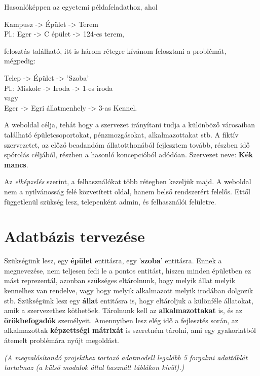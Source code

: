 \documentclass[a4paper,12pt]{article}
\begin{document}
Hasonlóképpen az egyetemi példafeladathoz, ahol
\begin{center}
	Kampusz -> Épület -> Terem \\[0.5cm]
	Pl.: Eger -> C épület -> 124-es terem,
\end{center}
felosztás található, itt is három rétegre kívánom felosztani a problémát, mégpedig:
\begin{center}
	Telep -> Épület -> 'Szoba'\\[0.5cm]
	Pl.: Miskolc -> Iroda -> 1-es iroda\\
	vagy\\
	Eger -> Egri állatmenhely -> 3-as Kennel.
\end{center}

A weboldal célja, tehát hogy a szervezet irányítani tudja a különböző városaiban található épületcsoportokat, pénzmozgásokat, alkalmazottakat stb.
A fiktív szervezetet, az előző beadandóm állatotthonából fejlesztem tovább, részben idő spórolás céljából, részben a hasonló koncepcióból adódóan.
 Szervezet neve: \textbf{Kék mancs}.

Az \textit{elképzelés} szerint, a felhasználókat több rétegben kezeljük majd. A weboldal nem a nyilvánosság felé közvetített oldal, hanem belső rendszerért felelős. Ettől függetlenül szükség lesz, telepenként admin, és felhasználói felületre. 


\section{Adatbázis tervezése}

Szükségünk lesz, egy \textbf{épület} entitásra, egy '\textbf{szoba}' entitásra. Ennek a megnevezése, nem teljesen fedi le a pontos entitást, hiszen minden épületben ez mást reprezentál, azonban szükséges eltárolnunk, hogy melyik állat melyik kennelhez van rendelve, vagy hogy melyik alkalmazott melyik irodában dolgozik stb. Szükségünk lesz egy \textbf{állat} entitásra is, hogy eltároljuk a különféle állatokat, amik a szervezethez köthetőek. Tárolnunk kell az \textbf{alkalmazottakat} is, és az \textbf{örökbefogadók} személyeit. Amennyiben lesz elég idő a fejlesztés során, az alkalmazottak \textbf{képzettségi mátrixát} is szeretném tárolni, ami egy gyakorlatból átemelt problémára nyújt megoldást.

\begin{center}
	\textit{{\footnotesize (A megvalósítandó projekthez tartozó adatmodell legalább 5 forgalmi adattáblát tartalmaz (a külső modulok által használt táblákon kívül).)}}
\end{center}
\end{document}
